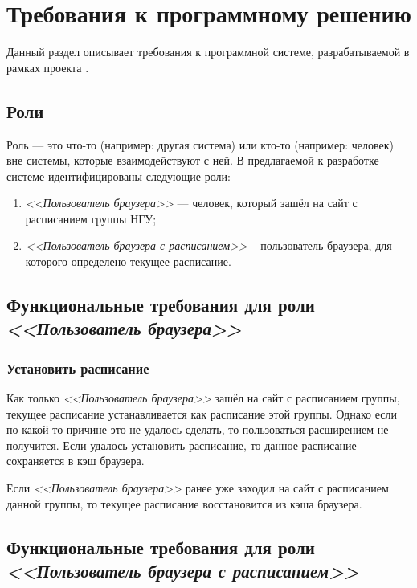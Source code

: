 \newcommand{\actor}[1]{\textit{<<#1>>}}

\chapter{Требования к программному решению}
	\label{chapter3}

	Данный раздел описывает требования к программной системе, разрабатываемой в рамках проекта \ProjectName.
		
	\section{Роли}
		Роль --- это что-то (например: другая система) или кто-то (например: человек) вне системы, которые взаимодействуют с ней. В предлагаемой к разработке системе идентифицированы следующие роли:
		\begin{enumerate}
			\item \actor{Пользователь браузера} --- человек, который зашёл на сайт с расписанием группы НГУ;
			
			\item \actor{Пользователь браузера с расписанием} -- пользователь браузера, для которого определено текущее расписание.
		\end{enumerate}
	
		\begin{figure}[h!]
			\centering
			\def\svgwidth{\columnwidth}
			
		\end{figure}
	\section{Функциональные требования для роли \actor{Пользователь браузера}}
		\subsection{Установить расписание}
			Как только \actor{Пользователь браузера} зашёл на сайт с расписанием группы, текущее расписание устанавливается как расписание этой группы. Однако если по какой-то причине это не удалось сделать, то пользоваться расширением не получится. Если удалось установить расписание, то данное расписание сохраняется в кэш браузера.
			
			Если \actor{Пользователь браузера} ранее уже заходил на сайт с расписанием данной группы, то текущее расписание восстановится из кэша браузера.
	\section{Функциональные требования для роли \actor{Пользователь браузера с расписанием}}
